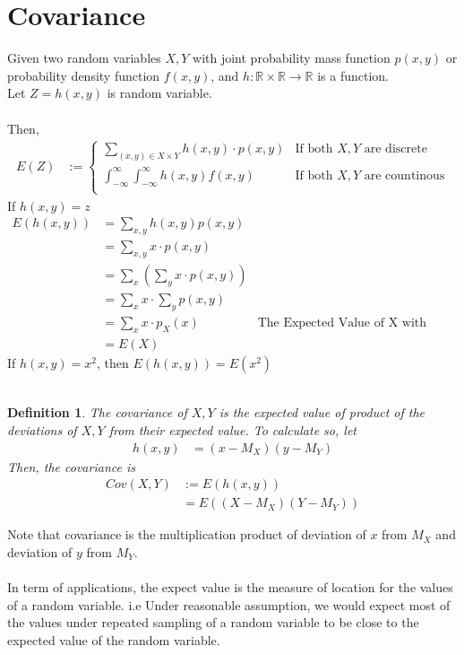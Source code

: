 \documentclass[11pt,oneside]{book}
\theoremstyle{break}
\theoremstyle{break}
\newtheorem{defn}{Definition}[corL]
\newcommand{\R}{\mathbb{R}}
\begin{document}
\section[Covariance]{\color{DarkOrchid}Covariance}
Given two random variables $X,Y$ with joint probability mass function $p(x,y)$ or probability density function $f(x,y)$, and $h:\R\times \R \longrightarrow \R$ is a function.\\
Let $Z=h(x,y)$ is random variable.\\
\hfill\\
Then,\begin{align*}
E(Z)&:=\begin{cases}
\sum_{(x,y)\in X\times Y}h(x,y)\cdot p(x,y) &\text{If both }X,Y \text{ are discrete}\\
\int_{-\infty}^{\infty} \int_{-\infty}^{\infty} h(x,y)f(x,y)&\text{If both }X,Y \text{ are countinous}\\
\end{cases}
\end{align*}
If $h(x,y)=z$\begin{align*}
E(h(x,y))&=\sum_{x,y}h(x,y)p(x,y)\\
&=\sum_{x,y}x\cdot p(x,y)\\
&=\sum_{x}\left(\sum_{y}x\cdot p(x,y)\right)\\
&=\sum_{x}x\cdot \sum_{y} p(x,y)\\
&=\sum_{x}x\cdot p_X(x)&\text{The Expected Value of X with respect to the marginal}\\
&=E(X)
\end{align*}
If $h(x,y)=x^2$, then $E(h(x,y))=E(x^2)$\\
\hfill\\
\begin{defn}
The covariance of $X,Y$ is the expected value of product of the deviations of $X,Y$ from their expected value. To calculate so, let \begin{align*}
h(x,y)&=(x-M_X)(y-M_Y) 
\end{align*}
Then, the covariance is
\begin{align*}
Cov(X,Y)&:=E(h(x,y))\\
&=E((X-M_X)(Y-M_Y))
\end{align*}
\end{defn}
Note that covariance is the multiplication product of deviation of $x$ from $M_X$ and deviation of $y$ from $M_Y$.\\
\hfill\\
In term of applications, the expect value is the measure of location for the values of a random variable. i.e Under reasonable assumption, we would expect most of the values under repeated sampling of a random variable to be close to the expected value of the random variable.\\
\end{document}
